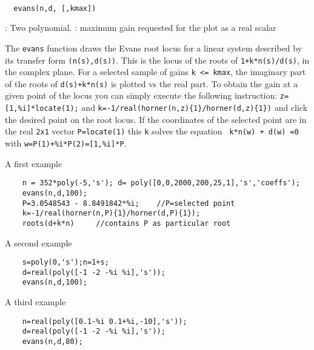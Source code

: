 \begin{mandesc}
  \\ %
\end{mandesc}
\begin{calling_sequence}
\begin{verbatim}
  evans(n,d, [,kmax])
\end{verbatim}
\end{calling_sequence}
\begin{parameters}
  \begin{varlist}
    : Two polynomial.
    : maximum gain requested for the plot as a real scalar
  \end{varlist}
\end{parameters}

\begin{mandescription}
  The \verb!evans! function draws the Evans root locus for a linear system
  described by its transfer form \verb!(n(s),d(s))!. This is the locus of the
  roots of \verb!1+k*n(s)/d(s)!, in the complex plane. For a selected sample of
  gains \verb!k <= kmax!, the imaginary part of the roots of \verb!d(s)+k*n(s)!
  is plotted vs the real part. To obtain the gain at a given point of the locus
  you can simply execute the following instruction: \verb!z=[1,%i]*locate(1);!
  and \verb!k=-1/real(horner(n,z){1}/horner(d,z){1})!
  and click the desired point on the root locus. If the coordinates of the
  selected point are in the real \verb!2x1! vector \verb!P=locate(1)! this \verb!k!
  solves the equation \verb! k*n(w) + d(w) =0! with
  \verb!w=P(1)+%i*P(2)=[1,%i]*P!.
\end{mandescription}
\begin{examples}

  \noindent A first example
  \begin{Verbatim}
    n = 352*poly(-5,'s'); d= poly([0,0,2000,200,25,1],'s','coeffs');
    evans(n,d,100);
    P=3.0548543 - 8.8491842*%i;    //P=selected point
    k=-1/real(horner(n,P){1}/horner(d,P){1});
    roots(d+k*n)     //contains P as particular root
  \end{Verbatim}

  \noindent A second example
  \begin{Verbatim}
    s=poly(0,'s');n=1+s;
    d=real(poly([-1 -2 -%i %i],'s'));
    evans(n,d,100);
  \end{Verbatim}
  \noindent A third example
  \begin{Verbatim}
    n=real(poly([0.1-%i 0.1+%i,-10],'s'));
    d=real(poly([-1 -2 -%i %i],'s'));
    evans(n,d,80);
  \end{Verbatim}
\end{examples}
\begin{manseealso}
    
\end{manseealso}

